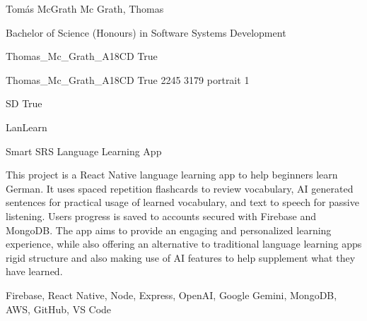 \documentclass[twoside]{report}
\begin{document}
\begingroup{}\relax



\def\Key{Thomas_Mc_Grath_A18CD}

{Tomás McGrath}
{Mc Grath, Thomas}

{Bachelor of Science (Honours) in Software Systems Development}

{Thomas_Mc_Grath_A18CD}
{True}

{Thomas_Mc_Grath_A18CD}
{True}
{2245}
{3179}
{portrait}
{1}

{SD}
{True}

{LanLearn}

{Smart SRS Language Learning App}

{This project is a React Native language learning app to help beginners learn German. It uses spaced repetition flashcards to review vocabulary, AI generated sentences for practical usage of learned vocabulary, and text to speech for passive listening. Users progress is saved to accounts secured with Firebase and MongoDB. The app aims to provide an engaging and personalized learning experience, while also offering an alternative to traditional language learning apps rigid structure and also making use of AI features to help supplement what they have learned.}

{Firebase, React Native, Node, Express, OpenAI, Google Gemini, MongoDB, AWS, GitHub, VS Code}
\end{document}
